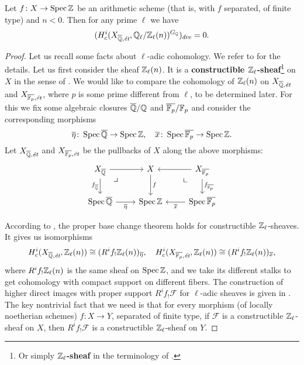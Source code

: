\documentclass{article}
\numberwithin{equation}{section}
\begin{document}
\begin{proposition}
  \label{prop:l-adic-cohomology-key-lemma}
  Let $f\colon X\to \operatorname{Spec} \mathbb{Z}$ be an arithmetic scheme (that is, with $f$
  separated, of finite type) and $n < 0$. Then for any prime $\ell$ we have
  $$(H^i_c (X_{\overline{\mathbb{Q}},\text{\it ét}}, \mathbb{Q}_\ell/\mathbb{Z}_\ell (n))^{G_{\mathbb{Q}}})_{div} = 0.$$

  \begin{proof}
    Let us recall some facts about $\ell$-adic cohomology. We refer to
    \cite[Exposé~VI]{SGA5} for the details. Let us first consider the sheaf
    $\mathbb{Z}_\ell (n)$. It is a
    \textbf{constructible $\mathbb{Z}_\ell$-sheaf}\footnote{Or simply
      \textbf{$\mathbb{Z}_\ell$-sheaf} in the terminology of \cite[Rapport]{SGA4-1-2}.}
    on $X$ in the sense of \cite[Exposé~VI, 1.1.1]{SGA5}. We would like to
    compare the cohomology of $\mathbb{Z}_\ell (n)$ on
    $X_{\overline{\mathbb{Q}},\text{\it ét}}$ and $X_{\overline{\mathbb{F}_p},\text{\it ét}}$,
    where $p$ is some prime different from $\ell$, to be determined later.
    For this we fix some algebraic closures $\overline{\mathbb{Q}}/\mathbb{Q}$ and
    $\overline{\mathbb{F}_p}/\mathbb{F}_p$ and consider the corresponding morphisms
    \[ \overline{\eta}\colon \operatorname{Spec} \overline{\mathbb{Q}} \to \operatorname{Spec} \mathbb{Z}, \quad
    \overline{x}\colon \operatorname{Spec} \overline{\mathbb{F}_p} \to \operatorname{Spec} \mathbb{Z}. \]
    Let $X_{\overline{\mathbb{Q}},\text{\it ét}}$ and
    $X_{\overline{\mathbb{F}_p},\text{\it ét}}$ be the pullbacks of $X$ along the above
    morphisms:
    \[ \begin{tikzcd}
      X_{\overline{\QQ}} \ar{r}\tikzpb\ar{d}[swap]{f_{\overline{\QQ}}} & X \ar{d}{f} & X_{\overline{\FF_p}} \ar{l}\ar{d}{f_{\overline{\FF_p}}}\tikzpbur \\
      \Spec \overline{\QQ} \ar{r}[swap]{\overline{\eta}} & \Spec \ZZ & \Spec \overline{\FF_p} \ar{l}{\overline{x}}
    \end{tikzcd} \]

    According to \cite[Exposé~VI, 2.2.3]{SGA5}, the proper base change theorem
    holds for constructible $\mathbb{Z}_\ell$-sheaves. It gives us isomorphisms
    \[ H^i_c (X_{\overline{\mathbb{Q}}, \text{\it ét}}, \mathbb{Z}_\ell (n)) \cong (R^i f_! \mathbb{Z}_\ell (n))_{\overline{\eta}}, \quad
    H^i_c (X_{\overline{\mathbb{F}_p}, \text{\it ét}}, \mathbb{Z}_\ell (n)) \cong (R^i f_! \mathbb{Z}_\ell (n))_{\overline{x}}, \]
    where $R^i f_! \mathbb{Z}_\ell (n)$ is the same sheaf on $\operatorname{Spec} \mathbb{Z}$, and we take
    its different stalks to get cohomology with compact support on different
    fibers. The construction of higher direct images with proper support
    $R^i f_! \mathcal{F}$ for $\ell$-adic sheaves is given in
    \cite[Exposé~VI, \S 2.2]{SGA5}. The key nontrivial fact that we need is that
    for every morphism (of locally noetherian schemes) $f\colon X\to Y$,
    separated of finite type, if $\mathcal{F}$ is a constructible
    $\mathbb{Z}_\ell$-sheaf on $X$, then $R^i f_! \mathcal{F}$ is a constructible
    $\mathbb{Z}_\ell$-sheaf on $Y$.


\end{proof}
\end{proposition}
\end{document}
